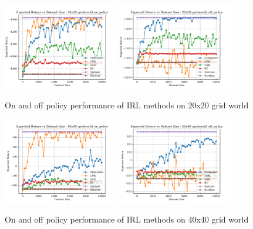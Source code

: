 \documentclass[11pt]{article}
\begin{document}
\begin{figure}[htbp]
	\centering
	\includegraphics[width=0.45\textwidth]{../src/plots/returns/20x20_gridworld_on_policy_returns.pdf}
	\includegraphics[width=0.45\textwidth]{../src/plots/returns/20x20_gridworld_off_policy_returns.pdf}
	\caption{On and off policy performance of IRL methods on 20x20 grid world}
	\label{fig:off_policy_vs_on_20}
\end{figure}

\begin{figure}[htbp]
	\centering
	\includegraphics[width=0.45\textwidth]{../src/plots/returns/40x40_gridworld_on_policy_returns.pdf}
	\includegraphics[width=0.45\textwidth]{../src/plots/returns/40x40_gridworld_off_policy_returns.pdf}
	\caption{On and off policy performance of IRL methods on 40x40 grid world}
	\label{fig:off_policy_vs_on_40}
\end{figure}
\end{document}
